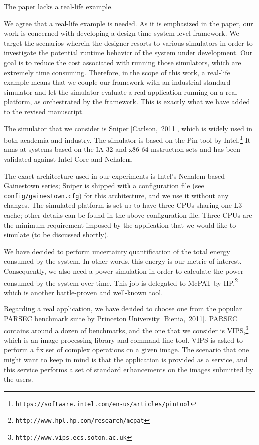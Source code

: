 \begin{reviewer}
 The paper lacks a real-life example.
\end{reviewer}

\begin{authors}
We agree that a real-life example is needed. As it is emphasized in the paper,
our work is concerned with developing a design-time system-level framework. We
target the scenarios wherein the designer resorts to various simulators in order
to investigate the potential runtime behavior of the system under development.
Our goal is to reduce the cost associated with running those simulators, which
are extremely time consuming. Therefore, in the scope of this work, a real-life
example means that we couple our framework with an industrial-standard simulator
and let the simulator evaluate a real application running on a real platform, as
orchestrated by the framework. This is exactly what we have added to the revised
manuscript.

The simulator that we consider is Sniper [Carlson,~2011], which is widely used
in both academia and industry. The simulator is based on the Pin tool by
Intel.\footnote{\texttt{https://software.intel.com/en-us/articles/pintool}} It
aims at systems based on the IA-32 and x86-64 instruction sets and has been
validated against Intel Core and Nehalem.

The exact architecture used in our experiments is Intel's Nehalem-based
Gainestown series; Sniper is shipped with a configuration file (see
\texttt{config/gainestown.cfg}) for this architecture, and we use it without any
changes. The simulated platform is set up to have three CPUs sharing one L3
cache; other details can be found in the above configuration file. Three CPUs
are the minimum requirement imposed by the application that we would like to
simulate (to be discussed shortly).

We have decided to perform uncertainty quantification of the total energy
consumed by the system. In other words, this energy is our metric of interest.
Consequently, we also need a power simulation in order to calculate the power
consumed by the system over time. This job is delegated to McPAT by
HP,\footnote{\texttt{http://www.hpl.hp.com/research/mcpat}} which is another
battle-proven and well-known tool.

Regarding a real application, we have decided to choose one from the popular
PARSEC benchmark suite by Princeton University [Bienia,~2011]. PARSEC contains
around a dozen of benchmarks, and the one that we consider is
VIPS,\footnote{\texttt{http://www.vips.ecs.soton.ac.uk}} which is an
image-processing library and command-line tool. VIPS is asked to perform a fix
set of complex operations on a given image. The scenario that one might want to
keep in mind is that the application is provided as a service, and this service
performs a set of standard enhancements on the images submitted by the users.


\end{authors}
